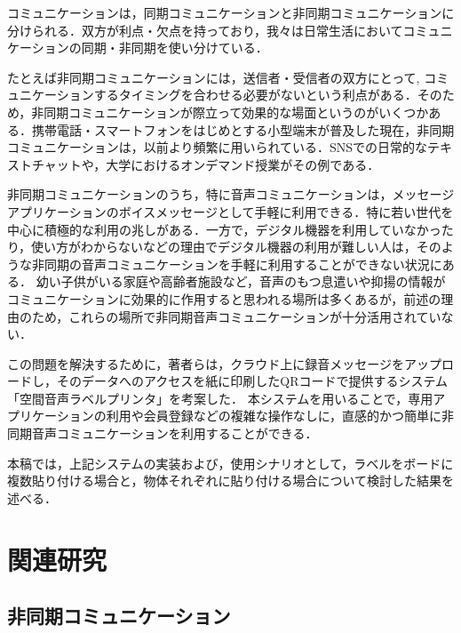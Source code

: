 \documentclass[submit,techrep,noauthor]{ipsj}
\begin{document}
コミュニケーションは，同期コミュニケーションと非同期コミュニケーションに分けられる．双方が利点・欠点を持っており，我々は日常生活においてコミュニケーションの同期・非同期を使い分けている．\par
たとえば非同期コミュニケーションには，送信者・受信者の双方にとって, コミュニケーションするタイミングを合わせる必要がないという利点がある．そのため，非同期コミュニケーションが際立って効果的な場面\cite{effective}というのがいくつかある．携帯電話・スマートフォンをはじめとする小型端末が普及した現在，非同期コミュニケーションは，以前より頻繁に用いられている．SNSでの日常的なテキストチャットや，大学におけるオンデマンド授業がその例である．\par
非同期コミュニケーションのうち，特に音声コミュニケーションは，メッセージアプリケーションのボイスメッセージとして手軽に利用できる．特に若い世代を中心に積極的な利用の兆しがある\cite{vox}．一方で，デジタル機器を利用していなかったり，使い方がわからないなどの理由でデジタル機器の利用が難しい人は，そのような非同期の音声コミュニケーションを手軽に利用することができない状況にある\cite{divide-1}\cite{divide-2}． 幼い子供がいる家庭や高齢者施設など，音声のもつ息遣いや抑揚の情報がコミュニケーションに効果的に作用すると思われる場所は多くあるが，前述の理由のため，これらの場所で非同期音声コミュニケーションが十分活用されていない．\par
この問題を解決するために，著者らは，クラウド上に録音メッセージをアップロードし，そのデータへのアクセスを紙に印刷したQRコードで提供するシステム「空間音声ラベルプリンタ」を考案した．
本システムを用いることで，専用アプリケーションの利用や会員登録などの複雑な操作なしに，直感的かつ簡単に非同期音声コミュニケーションを利用することができる．\par
本稿では，上記システムの実装および，使用シナリオとして，ラベルをボードに複数貼り付ける場合と，物体それぞれに貼り付ける場合について検討した結果を述べる．

\section{関連研究}


\subsection{非同期コミュニケーション}
\end{document}
